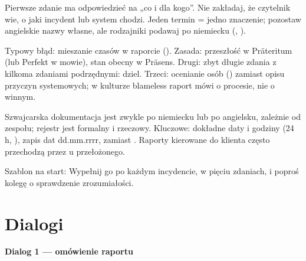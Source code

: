 \begin{zasada}
Pierwsze zdanie ma odpowiedzieć na „co i dla kogo”. Nie zakładaj, że czytelnik wie, o jaki incydent lub system chodzi. Jeden termin = jedno
znaczenie; pozostaw angielskie nazwy własne, ale rodzajniki podawaj po niemiecku (, ).
\end{zasada}

\begin{falle}
Typowy błąd: mieszanie czasów w raporcie (). Zasada: przeszłość w Präteritum (lub Perfekt w mowie),
stan obecny w Präsens. Drugi: zbyt długie zdania z kilkoma zdaniami podrzędnymi: dziel. Trzeci: ocenianie osób () zamiast opisu przyczyn
systemowych; w kulturze blameless raport mówi o procesie, nie o winnym.
\end{falle}

\begin{szwajcaria}
Szwajcarska dokumentacja jest zwykle po niemiecku lub po angielsku, zależnie od zespołu; rejestr jest formalny i rzeczowy.
Kluczowe: dokładne daty i godziny (24 h, ), zapis dat dd.mm.rrrr,  zamiast . Raporty kierowane do klienta
często przechodzą przez  u przełożonego.
\end{szwajcaria}

\begin{praca}
Szablon na start:  Wypełnij go po każdym
incydencie, w pięciu zdaniach, i poproś kolegę o sprawdzenie zrozumiałości.
\end{praca}

\section{Dialogi}
\textbf{Dialog 1 --- omówienie raportu}
\begin{dialog}
\end{dialog}

